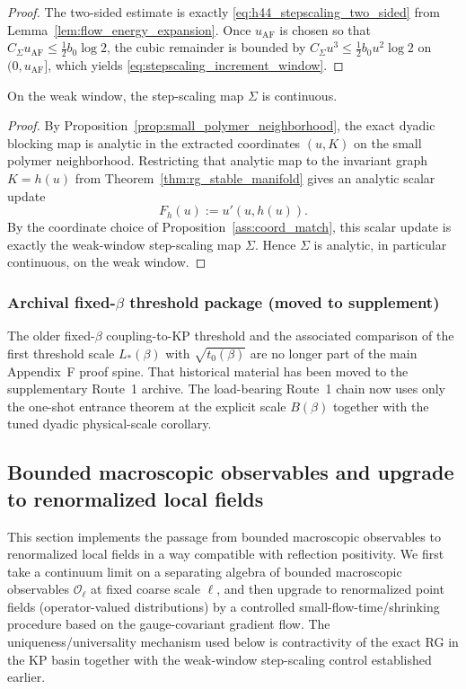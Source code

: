 \begin{proof}
The two-sided estimate is exactly \eqref{eq:h44_stepscaling_two_sided} from Lemma~\ref{lem:flow_energy_expansion}.
Once $u_{\mathrm{AF}}$ is chosen so that $C_\Sigma u_{\mathrm{AF}}\le \tfrac12 b_0\log 2$, the cubic remainder is bounded by
$C_\Sigma u^3\le \tfrac12 b_0 u^2\log 2$ on $(0,u_{\mathrm{AF}}]$, which yields \eqref{eq:stepscaling_increment_window}.
\end{proof}

\begin{lemma}\label{lem:stepscaling_continuous}
On the weak window, the step-scaling map $\Sigma$ is continuous.
\end{lemma}

\begin{proof}
By Proposition~\ref{prop:small_polymer_neighborhood}, the exact dyadic blocking map is analytic in the extracted coordinates $(u,K)$ on the small polymer neighborhood.
Restricting that analytic map to the invariant graph $K=h(u)$ from Theorem~\ref{thm:rg_stable_manifold} gives an analytic scalar update
\[
F_h(u):=u'(u,h(u)).
\]
By the coordinate choice of Proposition~\ref{ass:coord_match}, this scalar update is exactly the weak-window step-scaling map $\Sigma$.
Hence $\Sigma$ is analytic, in particular continuous, on the weak window.
\end{proof}

\subsubsection{Archival fixed-$\beta$ threshold package (moved to supplement)}
The older fixed-$\beta$ coupling-to-KP threshold and the associated comparison of the first threshold scale $L_*(\beta)$ with $\sqrt{t_0(\beta)}$
are no longer part of the main Appendix~F proof spine.
That historical material has been moved to the supplementary Route~1 archive.
The load-bearing Route~1 chain now uses only the one-shot entrance theorem at the explicit scale $B(\beta)$ together with the tuned dyadic physical-scale corollary.


\subsection{Bounded macroscopic observables and upgrade to renormalized local fields}
\label{sec:what_remains_continuum}

This section implements the passage from bounded macroscopic observables to renormalized local fields in a way compatible with reflection positivity.
We first take a continuum limit on a separating algebra of bounded macroscopic observables $\mathcal O_{\ell}$ at fixed coarse scale $\ell$,
and then upgrade to renormalized point fields (operator-valued distributions) by a controlled small-flow-time/shrinking procedure based on the
gauge-covariant gradient flow.
The uniqueness/universality mechanism used below is contractivity of the exact RG in the KP basin together with the weak-window step-scaling control established earlier.


